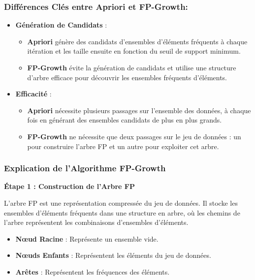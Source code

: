 \documentclass[a4paper, 12pt]{article}
\begin{document}
\subsubsection{Différences Clés entre Apriori et FP-Growth:}
\begin{itemize}
    \item \textbf{Génération de Candidats} : 
    \begin{itemize}
        \item \textbf{Apriori} génère des candidats d'ensembles d'éléments fréquents à chaque itération et les taille ensuite en fonction du seuil de support minimum.
        \item \textbf{FP-Growth} évite la génération de candidats et utilise une structure d'arbre efficace pour découvrir les ensembles fréquents d'éléments.
    \end{itemize}
    
    \item \textbf{Efficacité} :
    \begin{itemize}
        \item \textbf{Apriori} nécessite plusieurs passages sur l'ensemble des données, à chaque fois en générant des ensembles candidats de plus en plus grands.
        \item \textbf{FP-Growth} ne nécessite que deux passages sur le jeu de données : un pour construire l'arbre FP et un autre pour exploiter cet arbre.
    \end{itemize}
\end{itemize}

\subsubsection{Explication de l'Algorithme FP-Growth}

\textbf{Étape 1 : Construction de l'Arbre FP}

L'arbre FP est une représentation compressée du jeu de données. Il stocke les ensembles d'éléments fréquents dans une structure en arbre, où les chemins de l'arbre représentent les combinaisons d'ensembles d'éléments.

\begin{itemize}
    \item \textbf{Nœud Racine} : Représente un ensemble vide.
    \item \textbf{Nœuds Enfants} : Représentent les éléments du jeu de données.
    \item \textbf{Arêtes} : Représentent les fréquences des éléments.
\end{itemize}
\end{document}
